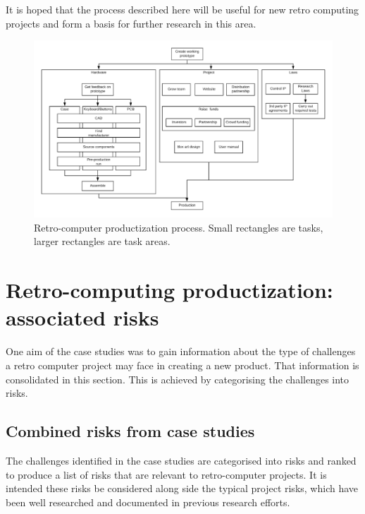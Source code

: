It is hoped that the process described here will be useful for new retro computing projects and form a basis for further research in this area. \\

\begin{figure} \begin{center}
\includegraphics[width= 1\linewidth]{pics/case_study_process} 
\end{center} 
\caption{Retro-computer productization process. Small rectangles are tasks, larger rectangles are task areas.}
\label{case_study_process}
\end{figure} 

\section{Retro-computing productization: associated risks}
One aim of the case studies was to gain information about the type of challenges a retro computer project may face in creating a new product. That information is consolidated in this section. This is achieved by categorising the challenges into risks.


\subsection{Combined risks from case studies}
The challenges identified in the case studies are categorised into risks and ranked to produce a list of risks that are relevant to retro-computer projects. It is intended these risks be considered along side the typical project risks, which have been well researched and documented in previous research efforts. 

